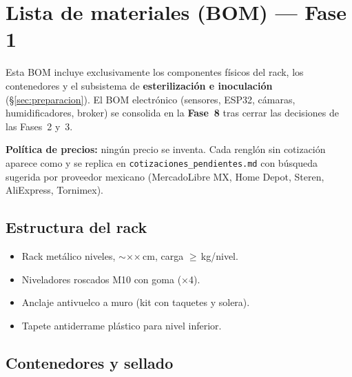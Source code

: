\section{Lista de materiales (BOM) --- Fase 1}
\label{sec:bom}

Esta BOM incluye exclusivamente los componentes físicos del rack, los
contenedores y el subsistema de \textbf{esterilización e inoculación}
(\S\ref{sec:preparacion}). El BOM electrónico (sensores, ESP32, cámaras,
humidificadores, broker) se consolida en la \textbf{Fase~8} tras cerrar
las decisiones de las Fases~2 y~3.

\textbf{Política de precios:} ningún precio se inventa. Cada renglón
sin cotización aparece como  y se replica en
\texttt{cotizaciones\_pendientes.md} con búsqueda sugerida por
proveedor mexicano (MercadoLibre MX, Home Depot, Steren, AliExpress,
Tornimex).

\subsection{Estructura del rack}
\label{sec:bom:rack}

\begin{itemize}[leftmargin=*,itemsep=0pt]
  \item Rack metálico \paramNiveles{} niveles, $\sim$\paramHmax$\times$\paramWmax$\times$\paramDmax\,cm,
        carga $\geq$\paramCargaUtilNivel\,kg/nivel.
  \item Niveladores roscados M10 con goma (×4).
  \item Anclaje antivuelco a muro (kit con taquetes y solera).
  \item Tapete antiderrame plástico para nivel inferior.
\end{itemize}

\subsection{Contenedores y sellado}
\label{sec:bom:contenedores}

